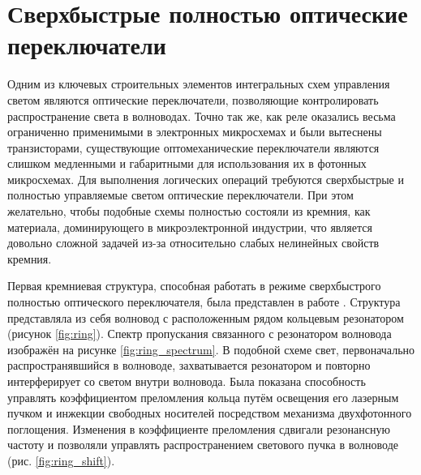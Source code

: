 \section{Сверхбыстрые полностью оптические переключатели}

Одним из ключевых строительных элементов интегральных схем управления светом являются оптические переключатели, позволяющие контролировать распространение света в волноводах. Точно так же, как реле оказались весьма ограниченно применимыми в электронных микросхемах и были вытеснены транзисторами, существующие оптомеханические переключатели являются слишком медленными и габаритными для использования их в фотонных микросхемах. Для выполнения логических операций требуются сверхбыстрые и полностью управляемые светом оптические переключатели. При этом желательно, чтобы подобные схемы полностью состояли из кремния, как материала, доминирующего в микроэлектронной индустрии, что является довольно сложной задачей из-за относительно слабых нелинейных свойств кремния.

Первая кремниевая структура, способная работать в режиме сверхбыстрого полностью оптического переключателя, была представлен в работе \cite{Vilson2004}. Структура представляла из себя волновод с расположенным рядом кольцевым резонатором (рисунок \ref{fig:ring}). Спектр пропускания связанного с резонатором волновода изображён на рисунке \ref{fig:ring_spectrum}. В подобной схеме свет, первоначально распространявшийся в волноводе, захватывается резонатором и повторно интерферирует со светом внутри волновода. Была показана способность управлять коэффициентом преломления кольца путём освещения его лазерным пучком и инжекции свободных носителей посредством механизма двухфотонного поглощения. Изменения в коэффициенте преломления сдвигали резонансную частоту и позволяли управлять распространением светового пучка в волноводе (рис. \ref{fig:ring_shift}).

